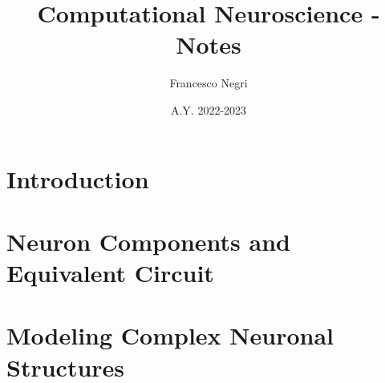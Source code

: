 \documentclass[12pt]{article}
\title{Computational Neuroscience - Notes}
\author{Francesco Negri}
\date{A.Y. 2022-2023}
\begin{document}
\maketitle

\tableofcontents
\newpage

\section{Introduction}
\graphicspath{ {./images/01/} }

\newpage

\section{Neuron Components and Equivalent Circuit}
\graphicspath{ {./images/02/} }

\newpage

\section{Modeling Complex Neuronal Structures}
\graphicspath{ {./images/03/} }

\newpage
\end{document}
